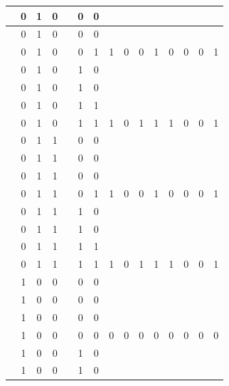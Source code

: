 \begin{table}[!tb]
\begin{tabular}{|c|c|c|c|c|c|c|c|c|c|c|c|c|c|c|}
        \rowcolor{yellow!40}  & 0 & 1 & 0 &  & 0 & 0 &  &  &  &  &  &  &  &  \\ \hline
        \rowcolor{yellow!40}  & 0 & 1 & 0 &  & 0 & 0 &  &  &  &  &  &  &  &  \\ \hline
        \rowcolor{yellow!40}  & 0 & 1 & 0 &  & 0 & 1 & 1 & 0 & 0 & 1 & 0 & 0 & 0 & 1 \\ \hline
        \rowcolor{gray!40}  & 0 & 1 & 0 &  & 1 & 0 &  &  &  &  &  &  &  &  \\ \hline
        \rowcolor{gray!40}  & 0 & 1 & 0 &  & 1 & 0 &  &  &  &  &  &  &  &  \\ \hline
        \rowcolor{gray!40}  & 0 & 1 & 0 &  & 1 & 1 &  &  &  &  &  &  &  &  \\ \hline
        \rowcolor{gray!40}  & 0 & 1 & 0 &  & 1 & 1 & 1 & 0 & 1 & 1 & 1 & 0 & 0 & 1 \\ \hline
        \rowcolor{blue!40}  & 0 & 1 & 1 &  & 0 & 0 &  &  &  &  &  &  &  &  \\ \hline
        \rowcolor{blue!40}  & 0 & 1 & 1 &  & 0 & 0 &  &  &  &  &  &  &  &  \\ \hline
        \rowcolor{blue!40}  & 0 & 1 & 1 &  & 0 & 0 &  &  &  &  &  &  &  &  \\ \hline
        \rowcolor{blue!40}  & 0 & 1 & 1 &  & 0 & 1 & 1 & 0 & 0 & 1 & 0 & 0 & 0 & 1 \\ \hline
        \rowcolor{red!40}  & 0 & 1 & 1 &  & 1 & 0 &  &  &  &  &  &  &  &  \\ \hline
        \rowcolor{red!40}  & 0 & 1 & 1 &  & 1 & 0 &  &  &  &  &  &  &  &  \\ \hline
        \rowcolor{red!40}  & 0 & 1 & 1 &  & 1 & 1 &  &  &  &  &  &  &  &  \\ \hline
        \rowcolor{red!40}  & 0 & 1 & 1 &  & 1 & 1 & 1 & 0 & 1 & 1 & 1 & 0 & 0 & 1 \\ \hline
        \rowcolor{green!40}  & 1 & 0 & 0 &  & 0 & 0 &  &  &  &  &  &  &  &  \\ \hline
        \rowcolor{green!40}  & 1 & 0 & 0 &  & 0 & 0 &  &  &  &  &  &  &  &  \\ \hline
        \rowcolor{green!40}  & 1 & 0 & 0 &  & 0 & 0 &  &  &  &  &  &  &  &  \\ \hline
        \rowcolor{green!40}  & 1 & 0 & 0 &  & 0 & 0 & 0 & 0 & 0 & 0 & 0 & 0 & 0 & 0 \\ \hline
        \rowcolor{yellow!40}  & 1 & 0 & 0 &  & 1 & 0 &  &  &  &  &  &  &  &  \\ \hline
        \rowcolor{yellow!40}  & 1 & 0 & 0 &  & 1 & 0 &  &  &  &  &  &  &  &  \\ \hline

\end{tabular}
\end{table}
